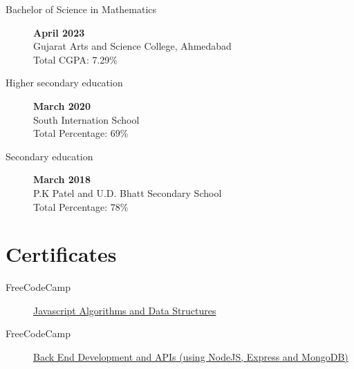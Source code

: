 \documentclass[a4paper]{article}
\begin{document}
\begin{description}
    \item[Bachelor of Science in Mathematics] \hfill  \textbf{April 2023} \\
        Gujarat Arts and Science College, Ahmedabad
        \\ Total CGPA\@: 7.29\%
    \item[Higher secondary education] \hfill \textbf{March 2020} \\
        South Internation School
        \\ Total Percentage: 69\%
    \item[Secondary education] \hfill \textbf{March 2018} \\
        P.K Patel and U.D. Bhatt Secondary School
        \\ Total Percentage: 78\%
\end{description}


\section*{ Certificates}
\begin{description}
    \item[FreeCodeCamp]
        \href{https://www.freecodecamp.org/certification/jaydamani/javascript-algorithms-and-data-structures}{
            Javascript Algorithms and Data Structures
        }
    \item[FreeCodeCamp]
        \href{https://www.freecodecamp.org/certification/jaydamani/back-end-development-and-apis}{
            Back End Development and APIs (using NodeJS, Express and MongoDB)
        }
\end{description}
\end{document}
